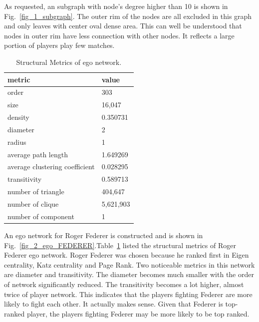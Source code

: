 \documentclass[runningheads]{llncs}
\begin{document}
As requested, an subgraph with node's degree higher than 10 is shown in Fig.~\ref{fig_1_subgraph}. The outer rim of the nodes are all excluded in this graph and only leaves with center oval dense area. This can well be understood that nodes in outer rim have less connection with other nodes. It reflects a large portion of players play few matches.

\begin{table}
\centering
\caption{Structural Metrics of ego network.}\label{tab_ego}
\begin{tabular}{|l|l|}
\hline
metric & value \\
\hline
order & 303 \\
size & 16,047 \\
density & 0.350731 \\
diameter & 2 \\
radius & 1 \\
average path length & 1.649269 \\ 
average clustering coefficient & 0.028295 \\ 
transitivity & 0.589713 \\ 
number of triangle & 404,647 \\ 
number of clique & 5,621,903 \\ 
number of component & 1 \\ \hline
\end{tabular}
\end{table}

An ego network for Roger Federer is constructed and is shown in Fig.~\ref{fig_2_ego_FEDERER}.Table~\ref{tab_ego} listed the structural metrics of Roger Federer ego network. Roger Federer was chosen because he ranked first in Eigen centrality, Katz centrality and Page Rank. Two noticeable metrics in this network are diameter and transitivity. The diameter becomes much smaller with the order of network significantly reduced. The transitivity becomes a lot higher, almost twice of player network. This indicates that the players fighting Federer are more likely to fight each other. It actually makes sense. Given that Federer is top-ranked player, the players fighting Federer may be more likely to be top ranked.
\end{document}
